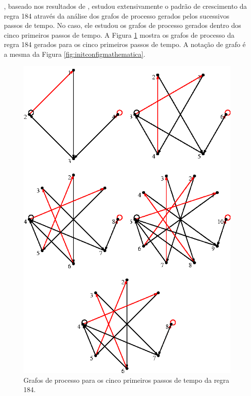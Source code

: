 \documentclass[12pt,a4paper]{article}
\begin{document}
, baseado nos resultados de ,
estudou extensivamente o padrão de crescimento da regra 184 através da análise
dos grafos de processo gerados pelos sucessivos passos de tempo. No caso, ele estudou
os grafos de processo gerados dentro dos cinco primeiros passos de tempo. A Figura
\ref{fig:184-5t} mostra os grafos de processo da regra 184 gerados para os cinco
primeiros passos de tempo. A notação de grafo é a mesma da Figura
\ref{fig:initconfigmathematica}.

\begin{figure}[htp]
\begin{center}
\includegraphics[scale=1]{img/184_5t.eps}
\caption{Grafos de processo para os cinco primeiros passos de tempo da regra 184.}
\label{fig:184-5t}
\end{center}
\end{figure}
\end{document}

